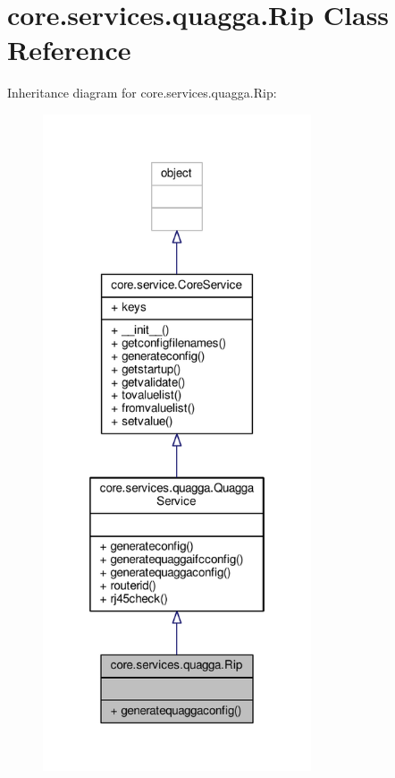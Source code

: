 \hypertarget{classcore_1_1services_1_1quagga_1_1_rip}{\section{core.\+services.\+quagga.\+Rip Class Reference}
\label{classcore_1_1services_1_1quagga_1_1_rip}
}


Inheritance diagram for core.\+services.\+quagga.\+Rip\+:
\nopagebreak
\begin{figure}[H]
\begin{center}
\leavevmode
\includegraphics[height=550pt]{classcore_1_1services_1_1quagga_1_1_rip__inherit__graph}
\end{center}
\end{figure}


